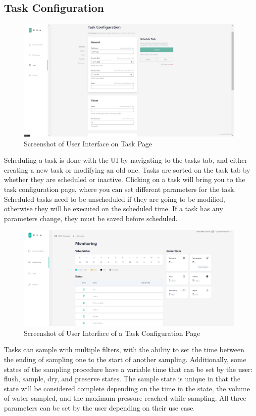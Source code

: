 \documentclass[11pt, letterpaper]{article}
\begin{document}
\subsection{Task Configuration} 
\begin{figure}[H]
	\centering
	\includegraphics[scale=0.35]{./Assets/UI-Task.png} %
	\caption{Screenshot of User Interface on Task Page}
\end{figure}
\par\noindent
Scheduling a task is done with the UI by navigating to the tasks tab, and either creating a new task or modifying an old one. Tasks are sorted on the task tab by whether they are scheduled or inactive. Clicking on a task will bring you to the task configuration page, where you can set different parameters for the task. Scheduled tasks need to be unscheduled if they are going to be modified, otherwise they will be executed on the scheduled time. If a task has any parameters change, they must be saved before scheduled. 
 
\begin{figure}[H]
	\centering
	\includegraphics[scale=0.35]{./Assets/UI.png} %
	\caption{Screenshot of User Interface of a Task Configuration Page }
\end{figure}
\par\noindent
Tasks can sample with multiple filters, with the ability to set the time between the ending of sampling one to the start of another sampling. Additionally, some states of the sampling procedure have a variable time that can be set by the user: flush, sample, dry, and preserve states. The sample state is unique in that the state will be considered complete depending on the time in the state, the volume of water sampled, and the maximum pressure reached while sampling. All three parameters can be set by the user depending on their use case.
\end{document}
